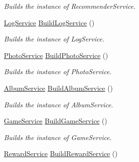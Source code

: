 \begin{DoxyCompactItemize}
\begin{DoxyCompactList}\small\item\em Builds the instance of Recommender\+Service. \end{DoxyCompactList}\item 
\hyperlink{classcom_1_1shephertz_1_1app42_1_1paas_1_1sdk_1_1csharp_1_1log_1_1_log_service}{Log\+Service} \hyperlink{classcom_1_1shephertz_1_1app42_1_1paas_1_1sdk_1_1csharp_1_1_service_a_p_i_a65188f775f1c72ccd4edd4dad1cd6b7e}{Build\+Log\+Service} ()
\begin{DoxyCompactList}\small\item\em Builds the instance of Log\+Service. \end{DoxyCompactList}\item 
\hyperlink{classcom_1_1shephertz_1_1app42_1_1paas_1_1sdk_1_1csharp_1_1gallery_1_1_photo_service}{Photo\+Service} \hyperlink{classcom_1_1shephertz_1_1app42_1_1paas_1_1sdk_1_1csharp_1_1_service_a_p_i_a3497410caec84d9ac88efb0968af15a0}{Build\+Photo\+Service} ()
\begin{DoxyCompactList}\small\item\em Builds the instance of Photo\+Service. \end{DoxyCompactList}\item 
\hyperlink{classcom_1_1shephertz_1_1app42_1_1paas_1_1sdk_1_1csharp_1_1gallery_1_1_album_service}{Album\+Service} \hyperlink{classcom_1_1shephertz_1_1app42_1_1paas_1_1sdk_1_1csharp_1_1_service_a_p_i_a9e164a55b12db3e5d4053a716c513859}{Build\+Album\+Service} ()
\begin{DoxyCompactList}\small\item\em Builds the instance of Album\+Service. \end{DoxyCompactList}\item 
\hyperlink{classcom_1_1shephertz_1_1app42_1_1paas_1_1sdk_1_1csharp_1_1game_1_1_game_service}{Game\+Service} \hyperlink{classcom_1_1shephertz_1_1app42_1_1paas_1_1sdk_1_1csharp_1_1_service_a_p_i_ae98660e6cf72e7557dd175f67a7c6a8d}{Build\+Game\+Service} ()
\begin{DoxyCompactList}\small\item\em Builds the instance of Game\+Service. \end{DoxyCompactList}\item 
\hyperlink{classcom_1_1shephertz_1_1app42_1_1paas_1_1sdk_1_1csharp_1_1reward_1_1_reward_service}{Reward\+Service} \hyperlink{classcom_1_1shephertz_1_1app42_1_1paas_1_1sdk_1_1csharp_1_1_service_a_p_i_a2e03bda67eea7674af14efbcc43b5c02}{Build\+Reward\+Service} ()

\end{DoxyCompactItemize}
